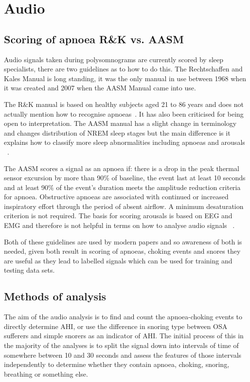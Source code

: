 \section{Audio}
\label{sec:audio-sophie}
\subsection{Scoring of apnoea R\&K vs. AASM}
Audio signals taken during polysomnograms are currently scored by sleep specialists, there are two guidelines as to how to do this. The Rechtschaffen and Kales Manual is long standing, it was the only manual in use between 1968 when it was created and 2007 when the AASM Manual came into use. 

The R\&K manual is based on healthy subjects aged 21 to 86 years and does not actually mention how to recognise apnoeas~\cite{rechtschaffen1968manual}. It has also been criticised for being open to interpretation. The AASM manual has a slight change in terminology and changes distribution of NREM sleep stages but the main difference is it explains how to classify more sleep abnormalities including apnoeas and arousals ~\cite{moser2009sleep}.

The AASM scores a signal as an apnoea if: there is a drop in the peak thermal sensor excursion by more than 90\% of baseline, the event last at least 10 seconds and at least 90\% of the event’s duration meets the amplitude reduction criteria for apnoea. Obstructive apnoeas are associated with continued or increased inspiratory effort through the period of absent airflow. A minimum desaturation criterion is not required. The basis for scoring arousals is based on EEG and EMG and therefore is not helpful in terms on how to analyse audio signals ~\cite{iber2007aasm}.

Both of these guidelines are used by modern papers and so awareness of both is needed, given both result in scoring of apnoeas, choking events and snores they are useful as they lead to labelled signals which can be used for training and testing data sets.
\subsection{Methods of analysis}
The aim of the audio analysis is to find and count the apnoea-choking events to directly determine AHI, or use the difference in snoring type between OSA sufferers and simple snorers as an indicator of AHI. The initial process of this in the majority of the analyses is to split the signal down into intervals of time of somewhere between 10 and 30 seconds and assess the features of those intervals independently to determine whether they contain apnoea, choking, snoring, breathing or something else.

